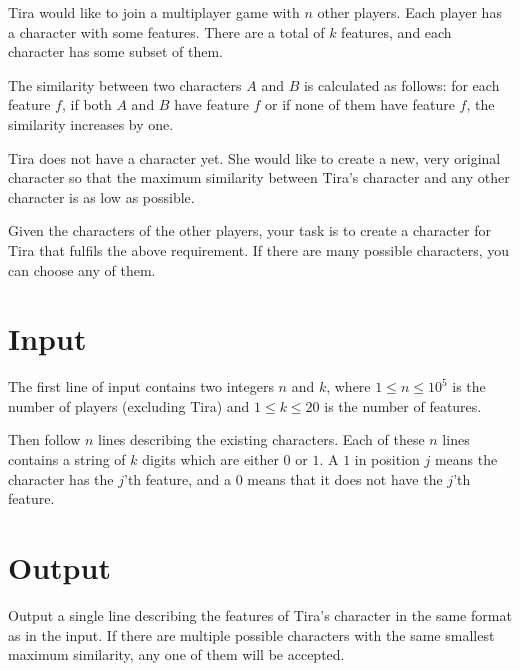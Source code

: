 
%
\noindent
Tira would like to join a multiplayer game with $n$ other players. Each player has a character with some features. There are a total of $k$ features, and each character has some subset of them.

The similarity between two characters $A$ and $B$ is calculated as follows: for each feature $f$, if both $A$ and $B$ have feature $f$ or if none of them have feature $f$, the similarity increases by one.

Tira does not have a character yet. She would like to create a new, very original character so that the maximum similarity between Tira's character and any other character is as low as possible.

Given the characters of the other players, your task is to create a character for Tira that fulfils the above requirement. If there are many possible characters, you can choose any of them.

\section*{Input}

The first line of input contains two integers $n$ and $k$, where $1 \le n \le 10^5$ is the number of players (excluding Tira) and $1 \le k \le 20$ is the number of features.

Then follow $n$ lines describing the existing characters. Each of these $n$ lines contains a string of $k$ digits which are either $0$ or $1$.  A $1$ in position $j$ means the character has the $j$'th feature, and a $0$ means that it does not have the $j$'th feature.

\section*{Output}

Output a single line describing the features of Tira's character in the same format as in the input.
If there are multiple possible characters with the same smallest maximum similarity, any one of them will be accepted.
